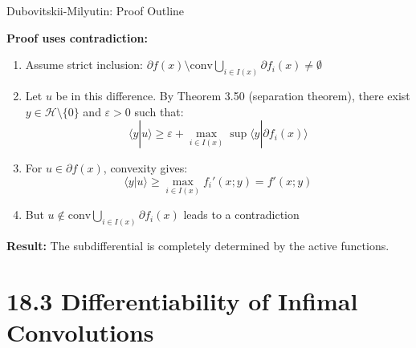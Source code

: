 \documentclass[aspectratio=169,10pt]{beamer}
\theoremstyle{definition}
\begin{document}
\begin{frame}{Dubovitskii-Milyutin: Proof Outline}

\textbf{Proof uses contradiction:}

\begin{enumerate}
  \item Assume strict inclusion: $\partial f(x) \setminus \text{conv} \bigcup_{i \in I(x)} \partial f_i(x) \neq \emptyset$

  \item Let $u$ be in this difference. By Theorem 3.50 (separation theorem), there exist
        $y \in \mathcal{H} \setminus \{0\}$ and $\varepsilon > 0$ such that:
        $$\langle y | u \rangle \geq \varepsilon + \max_{i \in I(x)} \sup \langle y | \partial f_i(x) \rangle$$

  \item For $u \in \partial f(x)$, convexity gives:
        $$\langle y | u \rangle \geq \max_{i \in I(x)} f_i'(x; y) = f'(x; y)$$

  \item But $u \notin \text{conv} \bigcup_{i \in I(x)} \partial f_i(x)$ leads to a contradiction
\end{enumerate}

\vspace{0.3cm}

\textbf{Result:} The subdifferential is completely determined by the active functions.

\end{frame}


\section{18.3 Differentiability of Infimal Convolutions}
\end{document}
